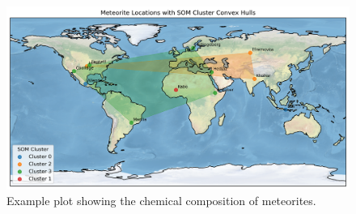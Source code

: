 
\begin{figure}[H]
    \centering
    \includegraphics[width=1.0\textwidth]{figures/locations_clusters_convexhull.png}
    \caption{Example plot showing the chemical composition of meteorites.}
    \label{fig:locations_som_convexhull}
\end{figure}